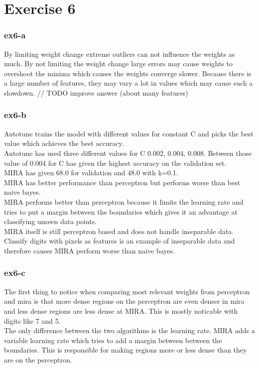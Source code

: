 \section{Exercise 6}
\subsubsection{ex6-a}
By limiting weight change extreme outliers can not influence the weights as much. By not limiting the weight change
large errors may cause weights to overshoot the minima which causes the weights converge slower. Because there is a large
number of features, they may vary a lot in values which may cause such a slowdown.
// TODO improve answer (about many features)

\subsubsection{ex6-b}
Autotune trains the model with different values for constant C and picks the best value which achieves the best
accuracy.\\
Autotune has used three different values for C {0.002, 0.004, 0.008}. Between those value of 0.004 for C has given the
highest accuracy on the validation set. \\
MIRA has given 68.0%
for validation and 48.0%
with k=0.1.\\
MIRA has better performance than perceptron but performs worse than best naive bayes. \\
MIRA performs better than perceptron because it limits the learning rate and tries to put a margin between the
boundaries which gives it an advantage at classifying unseen data points. \\
MIRA itself is still perceptron based and does not handle inseparable data. Classify digits with pixels as features is
an example of inseparable data and therefore causes MIRA perform worse than naive bayes.

\subsubsection{ex6-c}
The first thing to notice when comparing most relevant weights from perceptron and mira is that more dense regions on
the perceptron are even denser in mira and less dense regions are less dense at MIRA. This is mostly noticable with
digits like 7 and 5.\\
The only difference between the two algorithms is the learning rate. MIRA adds a variable learning rate which tries to
add a margin between between the boundaries. This is responsible for making regions more or less dense than they are on
the perceptron.